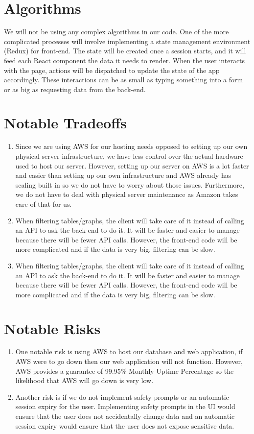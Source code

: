 \documentclass[11pt, titlepage]{article}
\begin{document}
\section{Algorithms}

We will not be using any complex algorithms in our code. One of the more complicated processes will involve implementing a state management environment (Redux) for front-end. The state will be created once a session starts, and it will feed each React component the data it needs to render. When the user interacts with the page, actions will be dispatched to update the state of the app accordingly. These interactions can be as small as typing something into a form or as big as requesting data from the back-end.

\section{Notable Tradeoffs}

\begin{enumerate}
    \item Since we are using AWS for our hosting needs opposed to setting up our own physical server infrastructure, we have less control over the actual hardware used to host our server. However, setting up our server on AWS is a lot faster and easier than setting up our own infrastructure and AWS already has scaling built in so we do not have to worry about those issues. Furthermore, we do not have to deal with physical server maintenance as Amazon takes care of that for us.
    \item When filtering tables/graphs, the client will take care of it instead of calling an API to ask the back-end to do it. It will be faster and easier to manage because there will be fewer API calls. However, the front-end code will be more complicated and if the data is very big, filtering can be slow.
    \item When filtering tables/graphs, the client will take care of it instead of calling an API to ask the back-end to do it. It will be faster and easier to manage because there will be fewer API calls. However, the front-end code will be more complicated and if the data is very big, filtering can be slow.
  \end{enumerate}

\section{Notable Risks}

\begin{enumerate}
    \item One notable risk is using AWS to host our database and web application, if AWS were to go down then our web application will not function. However, AWS provides a guarantee of 99.95\% Monthly Uptime Percentage so the likelihood that AWS will go down is very low. 
    \item Another risk is if we do not implement safety prompts or an automatic session expiry for the user. Implementing safety prompts in the UI would ensure that the user does not accidentally change data and an automatic session expiry would ensure that the user does not expose sensitive data.
\end{enumerate}
\end{document}
